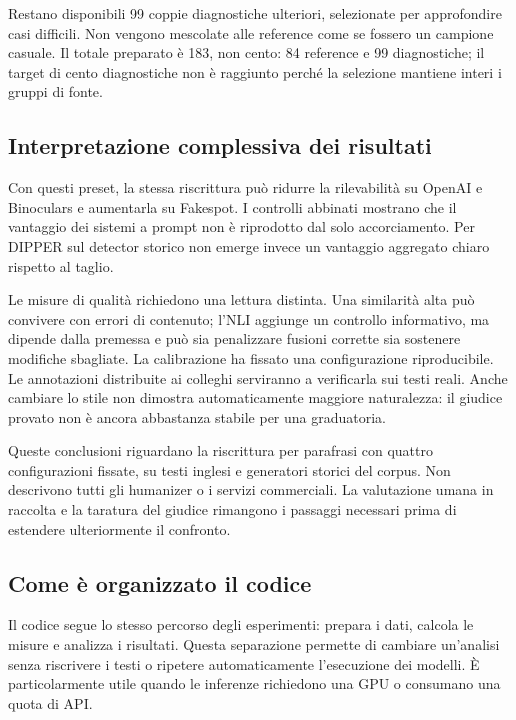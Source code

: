 Restano disponibili 99 coppie diagnostiche ulteriori, selezionate per approfondire casi difficili. Non vengono mescolate alle reference come se fossero un campione casuale. Il totale preparato è 183, non cento: 84 reference e 99 diagnostiche; il target di cento diagnostiche non è raggiunto perché la selezione mantiene interi i gruppi di fonte.

\subsection{Interpretazione complessiva dei risultati}\label{interpretazione-complessiva-dei-risultati}

Con questi preset, la stessa riscrittura può ridurre la rilevabilità su OpenAI e Binoculars e aumentarla su Fakespot. I controlli abbinati mostrano che il vantaggio dei sistemi a prompt non è riprodotto dal solo accorciamento. Per DIPPER sul detector storico non emerge invece un vantaggio aggregato chiaro rispetto al taglio.

Le misure di qualità richiedono una lettura distinta. Una similarità alta può convivere con errori di contenuto; l'NLI aggiunge un controllo informativo, ma dipende dalla premessa e può sia penalizzare fusioni corrette sia sostenere modifiche sbagliate. La calibrazione ha fissato una configurazione riproducibile. Le annotazioni distribuite ai colleghi serviranno a verificarla sui testi reali. Anche cambiare lo stile non dimostra automaticamente maggiore naturalezza: il giudice provato non è ancora abbastanza stabile per una graduatoria.

Queste conclusioni riguardano la riscrittura per parafrasi con quattro configurazioni fissate, su testi inglesi e generatori storici del corpus. Non descrivono tutti gli humanizer o i servizi commerciali. La valutazione umana in raccolta e la taratura del giudice rimangono i passaggi necessari prima di estendere ulteriormente il confronto.

\subsection{Come è organizzato il codice}\label{come-uxe8-organizzato-il-codice}

Il codice segue lo stesso percorso degli esperimenti: prepara i dati, calcola le misure e analizza i risultati. Questa separazione permette di cambiare un'analisi senza riscrivere i testi o ripetere automaticamente l'esecuzione dei modelli. È particolarmente utile quando le inferenze richiedono una GPU o consumano una quota di API.

